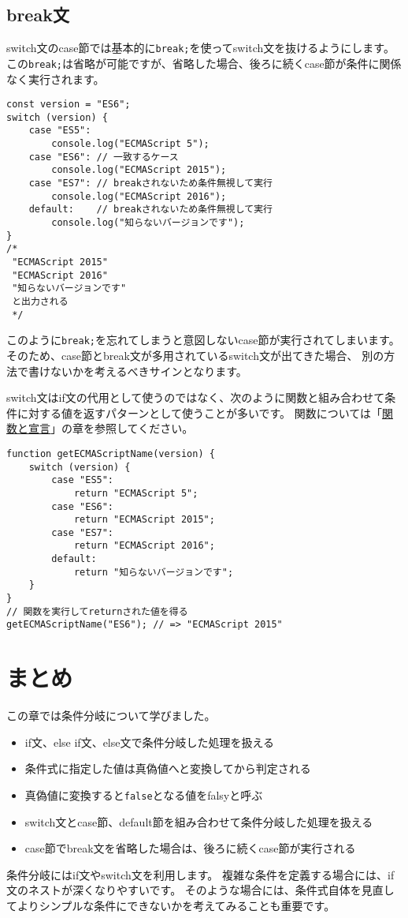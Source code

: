 \hypertarget{break-statement}{%
\subsection{break文}\label{break-statement}}

switch文のcase節では基本的に\texttt{break;}を使ってswitch文を抜けるようにします。
この\texttt{break;}は省略が可能ですが、省略した場合、後ろに続くcase節が条件に関係なく実行されます。

\begin{lstlisting}
const version = "ES6";
switch (version) {
    case "ES5":
        console.log("ECMAScript 5");
    case "ES6": // 一致するケース
        console.log("ECMAScript 2015");
    case "ES7": // breakされないため条件無視して実行
        console.log("ECMAScript 2016");
    default:    // breakされないため条件無視して実行
        console.log("知らないバージョンです");
}
/*
 "ECMAScript 2015"
 "ECMAScript 2016"
 "知らないバージョンです"
 と出力される
 */
 \end{lstlisting}

このように\texttt{break;}を忘れてしまうと意図しないcase節が実行されてしまいます。
そのため、case節とbreak文が多用されているswitch文が出てきた場合、
別の方法で書けないかを考えるべきサインとなります。

switch文はif文の代用として使うのではなく、次のように関数と組み合わせて条件に対する値を返すパターンとして使うことが多いです。
関数については「\hyperlink{function-and-declaration}{関数と宣言}」の章を参照してください。

\begin{lstlisting}
function getECMAScriptName(version) {
    switch (version) {
        case "ES5":
            return "ECMAScript 5";
        case "ES6":
            return "ECMAScript 2015";
        case "ES7":
            return "ECMAScript 2016";
        default:
            return "知らないバージョンです";
    }
}
// 関数を実行してreturnされた値を得る
getECMAScriptName("ES6"); // => "ECMAScript 2015"
\end{lstlisting}

\hypertarget{conclusion}{%
\section{まとめ}\label{conclusion}}

この章では条件分岐について学びました。

\begin{itemize}
\item
  if文、else if文、else文で条件分岐した処理を扱える
\item
  条件式に指定した値は真偽値へと変換してから判定される
\item
  真偽値に変換すると\texttt{false}となる値をfalsyと呼ぶ
\item
  switch文とcase節、default節を組み合わせて条件分岐した処理を扱える
\item
  case節でbreak文を省略した場合は、後ろに続くcase節が実行される
\end{itemize}

条件分岐にはif文やswitch文を利用します。
複雑な条件を定義する場合には、if文のネストが深くなりやすいです。
そのような場合には、条件式自体を見直してよりシンプルな条件にできないかを考えてみることも重要です。
